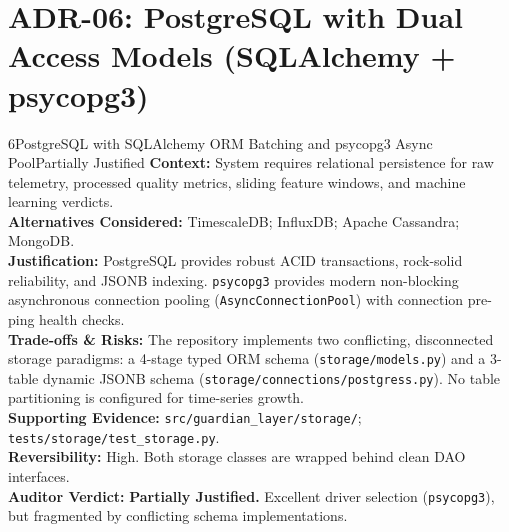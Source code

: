 \documentclass[10pt,a4paper]{report}
\begin{document}
\section{ADR-06: PostgreSQL with Dual Access Models (SQLAlchemy + psycopg3)}
\begin{adrbox}{6}{PostgreSQL with SQLAlchemy ORM Batching and psycopg3 Async Pool}{Partially Justified}
\textbf{Context:} System requires relational persistence for raw telemetry, processed quality metrics, sliding feature windows, and machine learning verdicts.\\
\textbf{Alternatives Considered:} TimescaleDB; InfluxDB; Apache Cassandra; MongoDB.\\
\textbf{Justification:} PostgreSQL provides robust ACID transactions, rock-solid reliability, and JSONB indexing. \texttt{psycopg3} provides modern non-blocking asynchronous connection pooling (\texttt{AsyncConnectionPool}) with connection pre-ping health checks.\\
\textbf{Trade-offs \& Risks:} The repository implements two conflicting, disconnected storage paradigms: a 4-stage typed ORM schema (\texttt{storage/models.py}) and a 3-table dynamic JSONB schema (\texttt{storage/connections/postgress.py}). No table partitioning is configured for time-series growth.\\
\textbf{Supporting Evidence:} \texttt{src/guardian\_layer/storage/}; \texttt{tests/storage/test\_storage.py}.\\
\textbf{Reversibility:} High. Both storage classes are wrapped behind clean DAO interfaces.\\
\textbf{Auditor Verdict:} \textbf{Partially Justified.} Excellent driver selection (\texttt{psycopg3}), but fragmented by conflicting schema implementations.
\end{adrbox}
\end{document}

